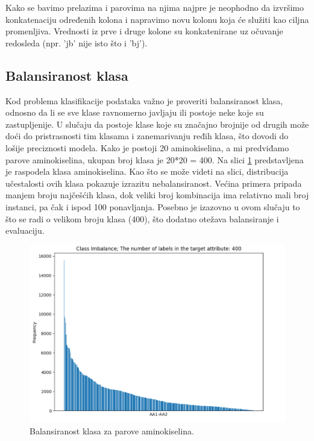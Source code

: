 \documentclass[a4paper,12pt]{article}
\begin{document}
Kako se bavimo prelazima i parovima na njima najpre je neophodno da izvršimo konkatenaciju određenih kolona i napravimo novu kolonu koja će služiti kao ciljna promenljiva. Vrednosti iz prve i druge kolone su konkatenirane uz očuvanje redosleda (npr. 'jb' nije isto što i 'bj').

\subsection{Balansiranost klasa}
Kod problema klasifikacije podataka važno je proveriti balansiranost klasa, odnosno da li se sve klase ravnomerno javljaju ili postoje neke koje su zastupljenije. U slučaju da postoje klase koje su značajno brojnije od drugih može doći do pristrasnosti tim klasama i zanemarivanju ređih klasa, što dovodi do lošije preciznosti modela.
Kako je postoji 20 aminokiselina, a mi predviđamo parove aminokiselina, ukupan broj klasa je 20*20 = 400. Na slici \ref{Slika:aa_imbalance} predstavljena je raspodela klasa aminokiselina.
Kao što se može videti na slici, distribucija učestalosti ovih klasa pokazuje izrazitu nebalansiranost. Većina primera pripada manjem broju najčešćih klasa, dok veliki broj kombinacija ima relativno mali broj instanci, pa čak i ispod 100 ponavljanja. Posebno je izazovno u ovom slučaju to što se radi o velikom broju klasa (400), što dodatno otežava balansiranje i evaluaciju.
\\
\begin{figure}[htbp]
    \centering
    \includegraphics[width=1\textwidth]{./images/aa_imbalance.png}
    \caption{Balansiranost klasa za parove aminokiselina.}
    \label{Slika:aa_imbalance}
\end{figure}
\end{document}
